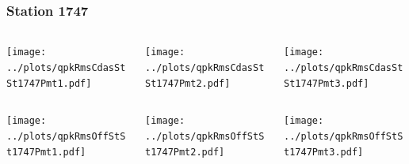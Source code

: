 \documentclass[aspectratio=169]{beamer}
\begin{document}
\begin{frame} 
  \frametitle{Station 1747}
  \begin{center}
    \begin{columns}
      \begin{column}{0.33\textwidth}
        \texttt{[image: ../plots/qpkRmsCdasStSt1747Pmt1.pdf]}
      \end{column}
      \begin{column}{0.33\textwidth}
        \texttt{[image: ../plots/qpkRmsCdasStSt1747Pmt2.pdf]}
      \end{column}
      \begin{column}{0.33\textwidth}
        \texttt{[image: ../plots/qpkRmsCdasStSt1747Pmt3.pdf]}
      \end{column}
    \end{columns}
  \end{center}

  \begin{center}
    \begin{columns}
      \begin{column}{0.33\textwidth}
        \texttt{[image: ../plots/qpkRmsOffStSt1747Pmt1.pdf]}
      \end{column}
      \begin{column}{0.33\textwidth}
        \texttt{[image: ../plots/qpkRmsOffStSt1747Pmt2.pdf]}
      \end{column}
      \begin{column}{0.33\textwidth}
        \texttt{[image: ../plots/qpkRmsOffStSt1747Pmt3.pdf]}
      \end{column}
    \end{columns}
  \end{center}
\end{frame}
\end{document}

